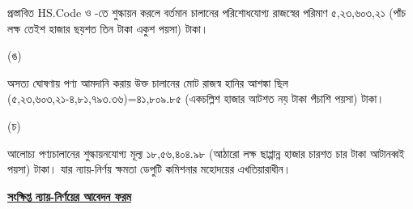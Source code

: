 \documentclass[12pt]{article}
\begin{document}
\begin{minipage}[t]{0.90\linewidth}
প্রস্তাবিত HS.Code ও {\cpcsso} -তে শুল্কায়ন করলে বর্তমান চালানের পরিশোধযোগ্য রাজস্বের পরিমাণ
৫,২৩,৬০৩,২১ (পাঁচ লক্ষ তেইশ হাজার ছয়শত তিন টাকা একুশ পয়সা) টাকা।
\\
\end{minipage}
\begin{minipage}[t]{0.05\linewidth}
\hspace{0em}
\end{minipage}
\begin{minipage}[t]{0.05\linewidth}
(ঙ)
\end{minipage}
\begin{minipage}[t]{0.90\linewidth}
অসত্য ঘোষণায় পণ্য আমদানি করায় উক্ত চালানের মোট রাজস্ব হানির আশঙ্কা ছিল
(৫,২৩,৬০৩,২১-৪,৮১,৭৯৩.৩৬)=৪১,৮০৯.৮৫
(একচল্লিশ হাজার আটশত নয় টাকা পঁচাশি পয়সা) টাকা।
\\
\end{minipage}
\begin{minipage}[t]{0.05\linewidth}
\hspace{0em}
\end{minipage}
\begin{minipage}[t]{0.05\linewidth}
(চ)
\end{minipage}
\begin{minipage}[t]{0.90\linewidth}
আলোচ্য পণ্যচালানের শুল্কায়নযোগ্য
মূল্য
১৮,৫৬,৪০৪.৯৮ (আঠারো লক্ষ ছাপ্পান্ন হাজার চারশত চার টাকা আটানব্বই পয়সা) টাকা।
যার ন্যায়-নির্ণয় ক্ষমতা ডেপুটি কমিশনার মহোদয়ের এখতিয়ারাধীন।
\\
\end{minipage}
\newpage
\begin{center}
\textbf{\underline{সংক্ষিপ্ত ন্যায়-নির্ণয়ের আবেদন ফরম}}
\end{center}
\end{document}
